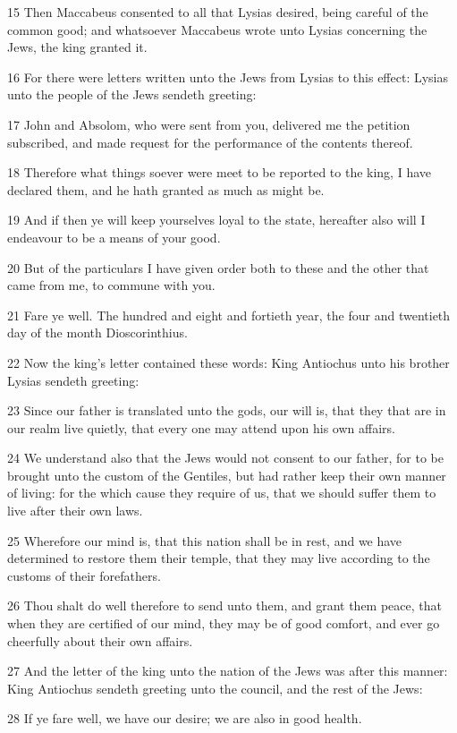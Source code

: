 \par 15 Then Maccabeus consented to all that Lysias desired, being careful of the common good; and whatsoever Maccabeus wrote unto Lysias concerning the Jews, the king granted it.
\par 16 For there were letters written unto the Jews from Lysias to this effect: Lysias unto the people of the Jews sendeth greeting:
\par 17 John and Absolom, who were sent from you, delivered me the petition subscribed, and made request for the performance of the contents thereof.
\par 18 Therefore what things soever were meet to be reported to the king, I have declared them, and he hath granted as much as might be.
\par 19 And if then ye will keep yourselves loyal to the state, hereafter also will I endeavour to be a means of your good.
\par 20 But of the particulars I have given order both to these and the other that came from me, to commune with you.
\par 21 Fare ye well. The hundred and eight and fortieth year, the four and twentieth day of the month Dioscorinthius.
\par 22 Now the king's letter contained these words: King Antiochus unto his brother Lysias sendeth greeting:
\par 23 Since our father is translated unto the gods, our will is, that they that are in our realm live quietly, that every one may attend upon his own affairs.
\par 24 We understand also that the Jews would not consent to our father, for to be brought unto the custom of the Gentiles, but had rather keep their own manner of living: for the which cause they require of us, that we should suffer them to live after their own laws.
\par 25 Wherefore our mind is, that this nation shall be in rest, and we have determined to restore them their temple, that they may live according to the customs of their forefathers.
\par 26 Thou shalt do well therefore to send unto them, and grant them peace, that when they are certified of our mind, they may be of good comfort, and ever go cheerfully about their own affairs.
\par 27 And the letter of the king unto the nation of the Jews was after this manner: King Antiochus sendeth greeting unto the council, and the rest of the Jews:
\par 28 If ye fare well, we have our desire; we are also in good health.
